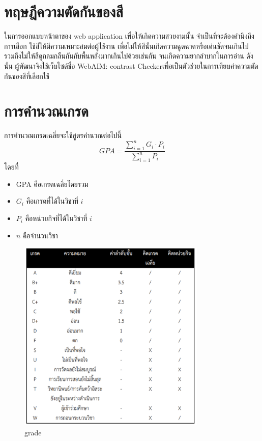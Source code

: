 \section{ทฤษฎีความตัดกันของสี}
ในการออกแบบหน้าตาของ web application เพื่อให้เกิดความสวยงามนั้น จําเป็นที่จะต้องคํานึงถึงการเลือก
ใช้สีให้มีความเหมาะสมต่อผู้ใช้งาน เพื่อไม่ให้สีนั้นเกิดความฉูดฉาดหรือเด่นชัดจนเกินไป รวมถึงไม่ให้สีดูกลมกลืนกันกับพื้นหลังมากเกินไปด้วยเช่นกัน จนเกิดความยากลําบากในการอ่าน ดังนั้น ผู้พัฒนาจึงใช้เว็บไซต์ชื่อ
WebAIM: contrast Checkerเพื่อเป็นตัวช่วยในการเทียบค่าความตัดกันของสีที่เลือกใช้


\section{การคํานวณเกรด}
การคํานวณเกรดเฉลี่ยจะใช้สูตรคํานวณต่อไปนี้
\begin{equation}\label{eq:grade}
  GPA = \frac{\sum_{i=1}^{n}{G_i}\cdot{P_i}}{\sum_{i=1}^{n}{P_i}}
\end{equation}
โดยที่
\noindent
  \begin{itemize}
    \item GPA คือเกรดเฉลี่ยโดยรวม
    \item $G_i$ คือเกรดที่ได้ในวิชาที่ $𝑖$
    \item $P_i$ คือหน่วยกิจที่ได้ในวิชาที่ $𝑖$ 
    \item $𝑛$ คือจํานวนวิชา
  \end{itemize}
\begin{figure}[h!]
  \begin{center}
    \includegraphics[width=0.8\textwidth]{all_grade.png}
    \caption{grade}
    \label{fig:grade}
  \end{center}
\end{figure}

